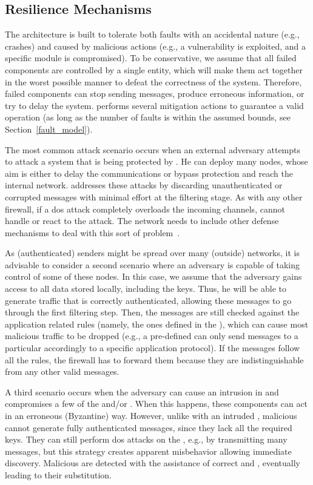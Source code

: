 \subsection{Resilience Mechanisms}


The \sieveq architecture is built to tolerate both faults with an accidental nature (e.g., crashes) and caused by malicious actions (e.g., a vulnerability is exploited, and a specific module is compromised).
To be conservative, we assume that all failed components are controlled by a single entity, which will make them act together in the worst possible manner to defeat the correctness of the system. Therefore, failed components can stop sending messages, produce erroneous information, or try to delay the system. 
\sieveq performs several mitigation actions to guarantee a valid operation (as long as the number of faults is within the assumed bounds, see Section~\ref{fault_model}).


The most common attack scenario occurs when an external adversary attempts to attack a system that is being protected by \sieveq. 
He can deploy many nodes, whose aim is either to delay the communications or bypass \sieveq protection and reach the internal network. \sieveq addresses these attacks by discarding unauthenticated or corrupted messages with minimal effort at the \presieve filtering stage.
As with any other firewall, if a \gls{dos} attack completely overloads the incoming channels, \sieveq cannot handle or react to the attack.
The network needs to include other defense mechanisms to deal with this sort of problem~\cite{Mishra:2011}.

As (authenticated) senders might be spread over many (outside) networks, it is advisable to consider a second scenario where an adversary is capable of taking control of some of these nodes. 
In this case, we assume that the adversary gains access to all data stored locally, including the \sender keys. 
Thus, he will be able to generate traffic that is correctly authenticated, allowing these messages to go through the first filtering step.
Then, the messages are still checked against the application related rules (namely, the ones defined in the \repsieve), which can cause most malicious traffic to be dropped (e.g., a pre-defined \sender can only send messages to a particular \postsieve accordingly to a specific application protocol).
If the messages follow all the rules, the firewall has to forward them because they are indistinguishable from any other valid messages.


A third scenario occurs when the adversary can cause an intrusion in \sieveq and compromises a few of the \presieves and/or \repsieves. 
When this happens, these components can act in an erroneous (Byzantine) way. 
However, unlike with an intruded \sender, malicious \presieves cannot generate fully authenticated messages, since they lack all the required keys. 
They can still perform \gls{dos} attacks on the \repsieves, e.g., by transmitting many messages, but this strategy creates apparent misbehavior allowing immediate discovery. 
Malicious \presieves are detected with the assistance of correct \sender and \repsieves, eventually leading to their substitution.

